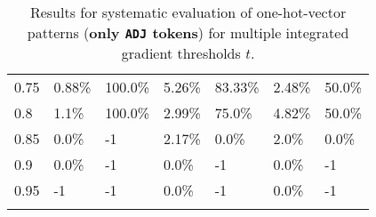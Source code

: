 \begin{table}[t]
\begin{tabular}{lllllll}
\multicolumn{1}{l|}{0.75}&  0.88\% & \multicolumn{1}{l|}{100.0\%}& 5.26\% & \multicolumn{1}{l|}{83.33\%}& 2.48\% & 50.0\%\\ 
\multicolumn{1}{l|}{0.8}&  1.1\% & \multicolumn{1}{l|}{100.0\%}& 2.99\% & \multicolumn{1}{l|}{75.0\%}& 4.82\% & 50.0\%\\ 
\multicolumn{1}{l|}{0.85}&  0.0\% & \multicolumn{1}{l|}{-1}& 2.17\% & \multicolumn{1}{l|}{0.0\%}& 2.0\% & 0.0\%\\ 
\multicolumn{1}{l|}{0.9}&  0.0\% & \multicolumn{1}{l|}{-1}& 0.0\% & \multicolumn{1}{l|}{-1}& 0.0\% & -1\\ 
\multicolumn{1}{l|}{0.95}&  -1 & \multicolumn{1}{l|}{-1}& 0.0\% & \multicolumn{1}{l|}{-1}& 0.0\% & -1\\ 


\\ \hline
\end{tabular}
\caption[Model Evaluation for only \texttt{ADJ} tokens]{Results for systematic evaluation of one-hot-vector patterns (\textbf{only \texttt{ADJ} tokens}) for multiple integrated gradient thresholds $t$.}
\label{tab:evalResultsADJ}
\end{table}
	